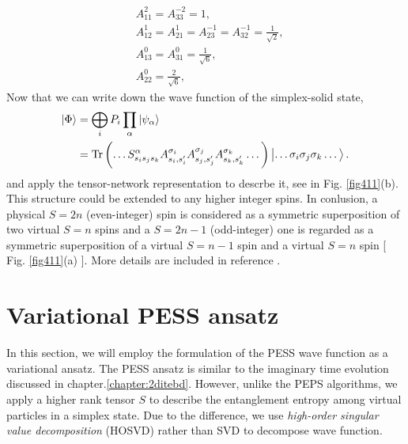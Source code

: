\[
	\begin{aligned}
		&A_{11}^2 = A_{33}^{-2} = 1, \\
		&A_{12}^1 = A_{21}^{1} = A_{23}^{-1} = A_{32}^{-1} = \frac{1}{\sqrt{2}}, \\
		&A_{13}^0 = A_{31}^{0} = \frac{1}{\sqrt{6}}, \\
		&A_{22}^0 = \frac{2}{\sqrt{6}},
	\end{aligned}
\]
Now that we can write down the wave function of the simplex-solid state,
\begin{align}
	\Ket{\Phi} &= \bigoplus_i P_i \prod_{\alpha}{\Ket{\psi_{\alpha}}} \\
	&= \operatorname{Tr} \left( \dots S_{s_i s_j s_k}^{\alpha} A^{\sigma_i}_{s_i,s_i^{\prime}} A^{\sigma_j}_{s_j,s_j^{\prime}} A^{\sigma_k}_{s_k,s_k^{\prime}} \dots \right) \Ket{\dots \sigma_i \sigma_j \sigma_k \dots}.
\end{align}
and apply the tensor-network representation to descrbe it, see in Fig. \ref{fig411}(b).
This structure could be extended to any higher integer spins. In conlusion, a physical $S=2n$ (even-integer) spin is considered as a symmetric superposition of two virtual $S=n$ spins and a $S=2n-1$ (odd-integer) one is regarded as a symmetric superposition of a virtual $S=n-1$ spin and a virtual $S=n$ spin [ Fig. \ref{fig411}(a) ]. More details are included in reference \cite{} \cite{}.
\section{Variational PESS ansatz}
In this section, we will employ the formulation of the PESS wave function as a variational ansatz. The PESS ansatz is similar to the imaginary time evolution discussed in chapter.\ref{chapter:2ditebd}. However, unlike the PEPS algorithms, we apply a higher rank tensor $S$ to describe the entanglement entropy among virtual particles in a simplex state. Due to the difference, we use \textit{high-order singular value decomposition} (HOSVD) rather than SVD to decompose wave function.
